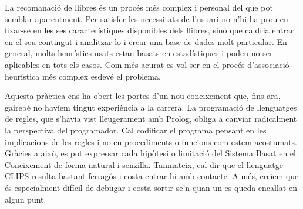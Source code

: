 
La recomanació de llibres és un procés més complex i personal del que pot semblar aparentment. Per satisfer les necessitats de l'usuari no n'hi ha prou en fixar-se en les ses característiques disponibles dels llibres, sinó que caldria entrar en el seu contingut i analitzar-lo i crear una base de dades molt particular. En general, molts heurístics usats estan basats en estadístiques i poden no ser aplicables en tots els casos. Com més acurat es vol ser en el procés d'associació heurística més complex esdevé el problema.

Aquesta pràctica ens ha obert les portes d'un nou coneixement que, fins ara, gairebé no havíem tingut experiència a la carrera. La programació de llenguatges de regles, que s'havia vist lleugerament amb Prolog, obliga a canviar radicalment la perspectiva del programador. Cal codificar el programa pensant en les implicacions de les regles i no en procediments o funcions com estem acostumats. Gràcies a això, es pot expressar cada hipòtesi o limitació del Sistema Basat en el Coneixement de forma natural i senzilla. Tanmateix, cal dir que el llenguatge CLIPS resulta bastant ferragós i costa entrar-hi amb contacte. A més, creiem que és especialment difícil de debugar i costa sortir-se'n quan un es queda encallat en algun punt.



